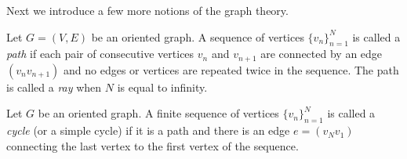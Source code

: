 \documentclass[12pt,oneside,a4paper]{amsart}
\begin{document}
    Next we introduce a few more notions of the graph theory.
    \begin{definition}
      Let $G = (V, E)$ be an oriented graph.
      A sequence of vertices $\{v_n\}_{n=1}^N$ is called a \emph{path} if each pair of consecutive vertices
        $v_n$ and $v_{n+1}$ are connected by an edge $(v_n v_{n+1})$ and no edges or vertices are repeated twice in the sequence.
      The path is called a \emph{ray} when $N$ is equal to infinity.
    \end{definition}
    \begin{definition}
      Let $G$ be an oriented graph.
      A finite sequence of vertices $\{v_n\}_{n=1}^N$ is called a \emph{cycle} (or a simple cycle) if it is
        a path and there is an edge $e = (v_N v_1)$ connecting the last vertex to the first vertex of the sequence.
    \end{definition}
\end{document}
